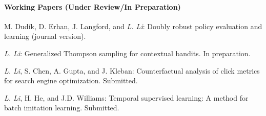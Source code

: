 \documentclass[10pt,twoside,letterpaper]{article}
\newcommand{\selffont}[1]{{\textit{#1}}}
\newcommand{\venuefont}[1]{{\textit{#1}}}
\newcommand{\negitemspace}{\vspace{1mm}}
\newcommand{\myself}{\selffont{L. Li}}
\begin{document}
\iffalse
\paragraph{Working Papers (Under Review/In Preparation)} \negitemspace

\begin{compactenum}[(W1)]







\item{M. Dud\'ik, D. Erhan, J. Langford, and \myself: Doubly robust policy evaluation and learning (journal version).}

\item{\myself: Generalized Thompson sampling for contextual bandits.  In preparation.}

\item{\myself, S. Chen, A. Gupta, and J. Kleban: Counterfactual analysis of click metrics for search engine
optimization.  Submitted.}

\item{\myself, H. He, and J.D. Williams: Temporal supervised learning: A method for batch imitation learning.  Submitted.}

\end{compactenum}
\end{document}
